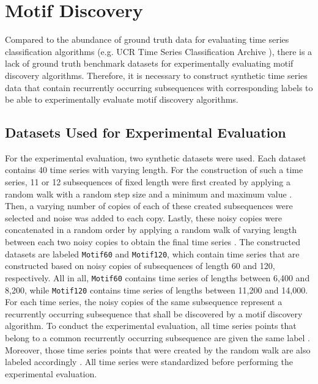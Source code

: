 \section{Motif Discovery}
Compared to the abundance of ground truth data for evaluating time series classification algorithms (e.g. UCR Time Series Classification Archive \cite{UCR_Archive}), there is a lack of ground truth benchmark datasets for experimentally evaluating motif discovery algorithms. Therefore, it is necessary to construct synthetic time series data that contain recurrently occurring subsequences with corresponding labels to be able to experimentally evaluate motif discovery algorithms.  
\subsection*{Datasets Used for Experimental Evaluation}
For the experimental evaluation, two synthetic datasets were used. Each dataset contains 40 time series with varying length. For the construction of such a time series, 11 or 12 subsequences of fixed length were first created by applying a random walk with a random step size and a minimum and maximum value \cite{Diss_VW}. Then, a varying number of copies of each of these created subsequences were selected and noise was added to each copy. Lastly, these noisy copies were concatenated in a random order by applying a random walk of varying length between each two noisy copies to obtain the final time series \cite{Diss_VW}. \newline
The constructed datasets are labeled \texttt{Motif60} and \texttt{Motif120}, which contain time series that are constructed based on noisy copies of subsequences of length 60 and 120, respectively. All in all, \texttt{Motif60} contains time series of lengths between 6,400 and 8,200, while \texttt{Motif120} contains time series of lengths between 11,200 and 14,000. \newline
For each time series, the noisy copies of the same subsequence represent a recurrently occurring subsequence that shall be discovered by a motif discovery algorithm. To conduct the experimental evaluation, all time series points that belong to a common recurrently occurring subsequence are given the same label \cite{Diss_VW}. Moreover, those time series points that were created by the random walk are also labeled accordingly \cite{Diss_VW}. \newline
All time series were standardized before performing the experimental evaluation.

